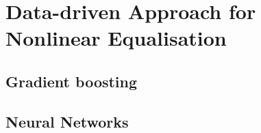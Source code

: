\chapter{Data-driven Approach for Nonlinear Equalisation}


\section{Gradient boosting}
\label{sec:gradient_boosting}


\section{Neural Networks}
\label{sec:neural_networks}


% 

